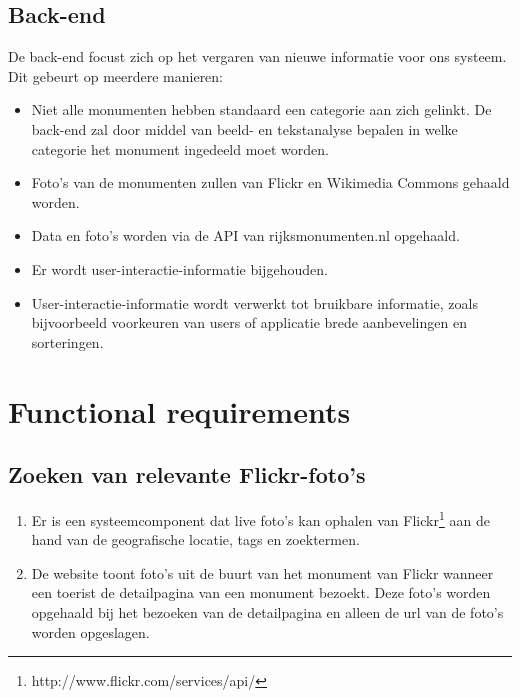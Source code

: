 \documentclass[a4paper,10pt]{article}
\begin{document}
		\subsection{Back-end}
			De back-end focust zich op het vergaren van nieuwe informatie voor ons systeem. Dit gebeurt op meerdere manieren:
			\begin{itemize}
				\item Niet alle monumenten hebben standaard een categorie aan zich gelinkt. De back-end zal door middel van beeld- en tekstanalyse bepalen in welke categorie het monument ingedeeld moet worden.
				\item Foto's van de monumenten zullen van Flickr en Wikimedia Commons gehaald worden.
				\item Data en foto's worden via de API van rijksmonumenten.nl opgehaald.
				\item Er wordt user-interactie-informatie bijgehouden.
				\item User-interactie-informatie wordt verwerkt tot bruikbare informatie, zoals bijvoorbeeld voorkeuren van users of applicatie brede aanbevelingen en sorteringen.
			\end{itemize}
			
		\clearpage
		\section{Functional requirements}
            \subsection{Zoeken van relevante Flickr-foto's}
            \begin{enumerate}
                \item Er is een systeemcomponent dat live foto's kan ophalen van Flickr\footnote{http://www.flickr.com/services/api/} aan de hand van de geografische locatie, tags en zoektermen.
                \item De website toont foto's uit de buurt van het monument van Flickr wanneer een toerist de detailpagina van een monument bezoekt. Deze foto's worden opgehaald bij het bezoeken van de detailpagina en alleen de url van de foto's worden opgeslagen.
            \end{enumerate}
            
\end{document}
